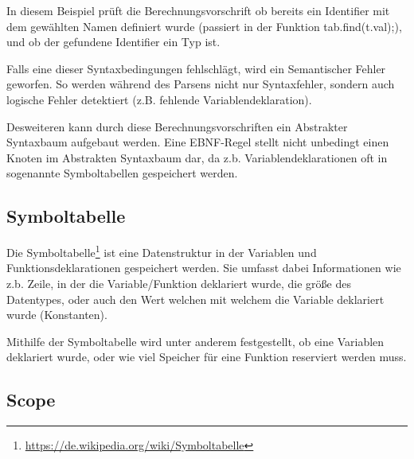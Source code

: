 In diesem Beispiel pr\"uft die Berechnungsvorschrift ob bereits ein Identifier mit dem gew\"ahlten Namen definiert wurde (passiert in der Funktion tab.find(t.val);), und ob der gefundene Identifier ein Typ ist. 

Falls eine dieser Syntaxbedingungen fehlschl\"agt, wird ein Semantischer Fehler geworfen. So werden w\"ahrend des Parsens nicht nur Syntaxfehler, sondern auch logische Fehler detektiert (z.B. fehlende Variablendeklaration).

Desweiteren kann durch diese Berechnungsvorschriften ein Abstrakter Syntaxbaum aufgebaut werden. Eine EBNF-Regel stellt nicht unbedingt einen Knoten im Abstrakten Syntaxbaum dar, da z.b. Variablendeklarationen oft in sogenannte Symboltabellen gespeichert werden.

\subsection{Symboltabelle}

Die Symboltabelle\footnote{\url{https://de.wikipedia.org/wiki/Symboltabelle}} ist eine Datenstruktur in der Variablen und Funktionsdeklarationen gespeichert werden. Sie umfasst dabei Informationen wie z.b. Zeile, in der die Variable/Funktion deklariert wurde, die gr\"o\ss{}e des Datentypes, oder auch den Wert welchen mit welchem die Variable deklariert wurde (Konstanten).

Mithilfe der Symboltabelle wird unter anderem festgestellt, ob eine Variablen deklariert wurde, oder wie viel Speicher f\"ur eine Funktion reserviert werden muss.


\subsection{Scope}